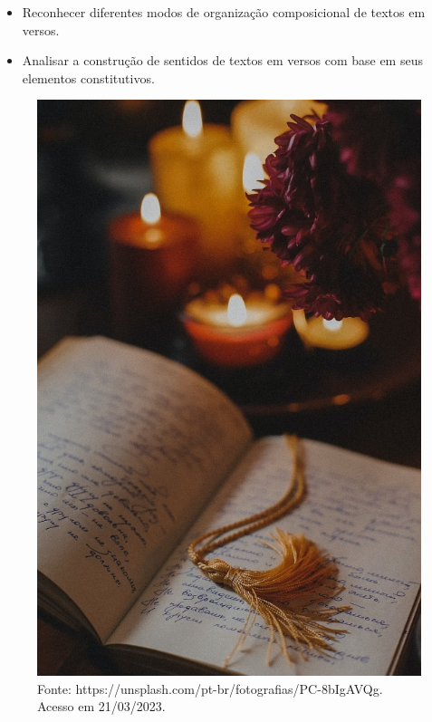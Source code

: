 \begin{itemize}
\item Reconhecer diferentes modos de organização composicional de textos em
versos.

\item Analisar a construção de sentidos de textos em versos com base em seus
elementos constitutivos.
\end{itemize}

\begin{figure}[htpb!]
\includegraphics[width=.5\textwidth]{./imgs/img16.jpg}
\caption{Fonte: https://unsplash.com/pt-br/fotografias/PC-8bIgAVQg. Acesso em 21/03/2023.}
\end{figure}

